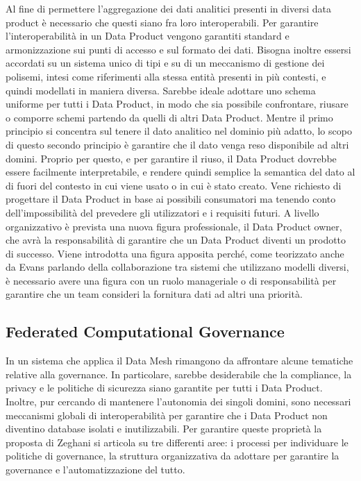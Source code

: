 \documentclass[12pt]{report}
\begin{document}
Al fine di permettere l'aggregazione dei dati analitici presenti in diversi data product è necessario che questi siano fra loro interoperabili.
Per garantire l'interoperabilità in un Data Product vengono garantiti standard e armonizzazione sui punti di accesso e sul formato dei dati.
Bisogna inoltre essersi accordati su un sistema unico di tipi e su di un meccanismo di gestione dei polisemi, intesi come riferimenti alla stessa entità presenti in più contesti, e quindi modellati in maniera diversa.
Sarebbe ideale adottare uno schema uniforme per tutti i Data Product, in modo che sia possibile confrontare, riusare o comporre schemi partendo da quelli di altri Data Product.
Mentre il primo principio si concentra sul tenere il dato analitico nel dominio più adatto, lo scopo di questo secondo principio è garantire che il dato venga reso disponibile ad altri domini.
Proprio per questo, e per garantire il riuso, il Data Product dovrebbe essere facilmente interpretabile, e rendere quindi semplice la semantica del dato al di fuori del contesto in cui viene usato o in cui è stato creato.
Vene richiesto di progettare il Data Product in base ai possibili consumatori ma tenendo conto dell'impossibilità del prevedere gli utilizzatori e i requisiti futuri.
A livello organizzativo è prevista una nuova figura professionale, il Data Product owner, che avrà la responsabilità di garantire che un Data Product diventi un prodotto di successo.
Viene introdotta una figura apposita perché, come teorizzato anche da Evans parlando della collaborazione tra sistemi che utilizzano modelli diversi, è necessario avere una figura con un ruolo manageriale o di responsabilità per garantire che un team consideri la fornitura dati ad altri una priorità.



\subsection{Federated Computational Governance }\label{federated governance}
In un sistema che applica il Data Mesh rimangono da affrontare alcune tematiche relative alla governance.
In particolare, sarebbe desiderabile che la compliance, la privacy e le politiche di sicurezza siano garantite per tutti i Data Product. 
Inoltre, pur cercando di mantenere l'autonomia dei singoli domini, sono necessari meccanismi globali di interoperabilità per garantire che i Data Product non diventino database isolati e inutilizzabili.
Per garantire queste proprietà la proposta di Zeghani si articola su tre differenti aree: i processi per individuare le politiche di governance, la struttura organizzativa da adottare per garantire la governance e l'automatizzazione del tutto.
\end{document}
